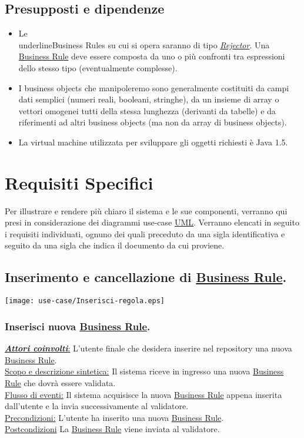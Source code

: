 \section{Presupposti e dipendenze}
\begin{itemize}
\item{Le \\underline{Business Rules} su cui si opera saranno di tipo \textit{\underline{Rejector}}. Una \underline{Business Rule} deve essere composta da uno o pi\`u confronti tra espressioni dello stesso tipo (eventualmente complesse).}
\item{I business objects che manipoleremo sono generalmente costituiti da campi dati semplici (numeri reali, booleani, stringhe), da un insieme di array o vettori omogenei tutti della stessa lunghezza (derivanti da tabelle) e da riferimenti ad altri business objects (ma non da array di business objects).
}
\item{La virtual machine utilizzata  per sviluppare gli oggetti richiesti \`e Java 1.5.}
\end{itemize}

\chapter{Requisiti Specifici}
Per illustrare e rendere pi\`u chiaro il sistema e le sue componenti, verranno qui presi in considerazione dei diagrammi use-case \underline{UML}. Verranno elencati in seguito i requisiti individuati, ognuno dei quali preceduto da una sigla identificativa e seguito da una sigla che indica il documento da cui proviene.


\section{Inserimento e cancellazione di \underline{Business Rule}.}
\begin{center}
 \texttt{[image: use-case/Inserisci-regola.eps]}
\end{center}

\subsection{Inserisci nuova \underline{Business Rule}.}
\underline{\textbf{\textit{Attori coinvolti}}:} L'utente finale che desidera inserire nel repository una nuova \underline{Business Rule}.\\
\underline{Scopo e descrizione sintetica:} Il sistema riceve in ingresso una nuova \underline{Business Rule} che dovr\`a essere validata.\\
\underline{Flusso di eventi:} Il sistema acquisisce la nuova \underline{Business Rule} appena inserita dall'utente e la invia successivamente al validatore.\\
\underline{Precondizioni:} L'utente ha inserito una nuova \underline{Business Rule}.\\
\underline{Postcondizioni} La \underline{Business Rule} viene inviata al validatore.

